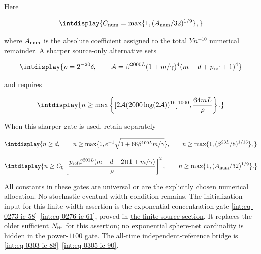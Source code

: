 Here


\begingroup\renewcommand{\theHequation}{intdisplay.203}
\begin{equation*}
\intdisplay{
C_{\rm num}=\max\{1,(A_{\rm num}/32)^{1/9}\},
}
\end{equation*}
\endgroup


where \(A_{\rm num}\) is the absolute coefficient assigned to the total \(Yn^{-10}\) numerical remainder. A sharper source-only alternative sets


\begingroup\renewcommand{\theHequation}{intdisplay.204}
\begin{equation*}
\intdisplay{
\rho=2^{-20}\delta,\qquad
\mathcal A=\beta^{2000L}(1+m/\gamma)^4
(m+d+p_{\rm ref}+1)^4
}
\end{equation*}
\endgroup


and requires


\begingroup\renewcommand{\theHequation}{intdisplay.205}
\begin{equation}
\intdisplay{
n\ge\max\left\{
[2\mathcal A(2000\log(2\mathcal A))^{16}]^{1000},
\frac{64mL}{\rho}
\right\}.
}
\label{int:eq-0088-seeded-factorized-source-gate}
\end{equation}
\endgroup


When this sharper gate is used, retain separately


\begingroup\renewcommand{\theHequation}{intdisplay.206}
\begin{equation}
\intdisplay{
n\ge d,\qquad
n\ge\max\{1,e^{-1}\sqrt{1+66\beta^{100L}m/\gamma}\},
\qquad
n\ge\max\{1,(\beta^{23L}/8)^{1/15}\},
}
\label{int:eq-0089-seeded-physical-gates}
\end{equation}
\endgroup

\begingroup\renewcommand{\theHequation}{intdisplay.207}
\begin{equation}
\intdisplay{
n\ge C_0\left[
\frac{p_{\rm ref}\beta^{201L}(m+d+2)(1+m/\gamma)}\rho
\right]^2,\qquad
n\ge\max\{1,(A_{\rm num}/32)^{1/9}\}.
}
\label{int:eq-0090-seeded-implementation-gates}
\end{equation}
\endgroup


All constants in these gates are universal or are the explicitly chosen numerical allocation. No stochastic eventual-width condition remains. The initialization input for this finite-width assertion is the exponential-concentration gate \eqref{int:eq-0273-ic-58}--\allowbreak \eqref{int:eq-0276-ic-61}, proved in \hyperref[int:decoder-finite-source]{the finite source section}. It replaces the older sufficient \(N_{\rm fit}\) for this assertion; no exponential sphere-net cardinality is hidden in the power-\(1100\) gate. The all-time independent-reference bridge is \eqref{int:eq-0303-ic-88}--\allowbreak \eqref{int:eq-0305-ic-90}.


